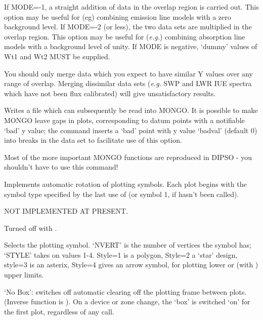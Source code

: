 \begin {description}
If MODE=-1, a straight addition of data in the overlap region is
carried out. This option may be useful for (eg) combining emission
line models with a zero background level. If MODE=-2 (or less), the
two data sets are multiplied in the overlap region. This option may be
useful for ({\em e.g.}) combining absorption line models with a
background level of unity. If MODE is negative, `dummy' values of Wt1
and Wt2 MUST be supplied.

You should only merge data which you expect to have similar Y values
over any range of overlap. Merging dissimilar data sets ({\em e.g.} SWP
and LWR IUE spectra which have not been flux calibrated) will give
unsatisfactory results.

Writes a file which can subsequently be read into MONGO. It is
possible to make MONGO leave gaps in plots, corresponding to datum
points with a notifiable `bad' y value; the   command inserts a
`bad' point with y value `badval' (default 0) into breaks in the
data set to facilitate use of this option.

Most of the more important MONGO functions are reproduced in DIPSO -
you shouldn't have to use this command!

Implements automatic rotation of plotting symbols. Each plot begins
with the symbol type specified by the last use of   (or symbol 1,
if   hasn't been called).

NOT IMPLEMENTED AT PRESENT.

Turned off with . 

Selects the   plotting symbol. `NVERT' is the number of vertices
the symbol has; `STYLE' takes on values 1-4. Style=1 is a polygon,
Style=2 a `star' design, style=3 is an asterix, Style=4 gives an arrow
symbol, for plotting lower or (with )  upper limits.

`No Box': switches off automatic clearing off the plotting frame
between plots. (Inverse function is ).  On a device or zone change,
the `box' is switched `on' for the first plot, regardless of any  
call.


\end{description}
